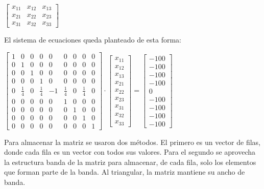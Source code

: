 \documentclass[a4paper]{article}
\begin{document}
$\begin{bmatrix}x_{11}&x_{12}&x_{13}\\x_{21}&x_{22}&x_{23}\\x_{31}&x_{32}&x_{33}\end{bmatrix}$ \newline \newline

El sistema de ecuaciones queda planteado de esta forma: \newline \newline

$\begin{bmatrix}1&0&0&0&0&0&0&0&0\\0&1&0&0&0&0&0&0&0\\0&0&1&0&0&0&0&0&0\\0&0&0&1&0&0&0&0&0\\0&\frac{1}{4}&0&\frac{1}{4}&-1&\frac{1}{4}&0&\frac{1}{4}&0\\0&0&0&0&0&1&0&0&0\\0&0&0&0&0&0&1&0&0\\0&0&0&0&0&0&0&1&0\\0&0&0&0&0&0&0&0&1\end{bmatrix} \cdot \begin{bmatrix}x_{11}\\x_{12}\\x_{13}\\x_{21}\\x_{22}\\x_{23}\\x_{31}\\x_{32}\\x_{33}\end{bmatrix} = \begin{bmatrix}-100\\-100\\-100\\-100\\0\\-100\\-100\\-100\\-100\end{bmatrix}$ \newline \newline

Para almacenar la matriz se usaron dos métodos. El primero es un vector de filas, donde cada fila es un vector con todos sus valores. Para el segundo se aprovecha la estructura banda de la matriz para almacenar, de cada fila, solo los elementos que forman parte de la banda. Al triangular, la matriz mantiene su ancho de banda. 
\end{document}
